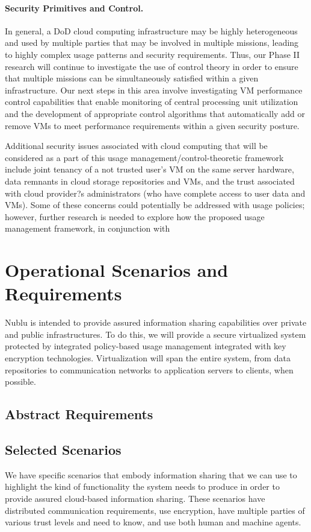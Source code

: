 \documentclass[10pt,letterpaper]{article}
\begin{document}
\paragraph{Security Primitives and Control.} In general, a DoD cloud computing infrastructure may be highly heterogeneous and used by multiple parties that may be involved in multiple missions, leading to highly complex usage patterns and security requirements. Thus, our Phase II research will continue to investigate the use of control theory in order to ensure that multiple missions can be simultaneously satisfied within a given infrastructure. Our next steps in this area involve investigating VM performance control capabilities that enable monitoring of central processing unit utilization and the development of appropriate control algorithms that automatically add or remove VMs to meet performance requirements within a given security posture.

Additional security issues associated with cloud computing that will be considered as a part of this usage management/control-theoretic framework include joint tenancy of a not trusted user's VM on the same server hardware, data remnants in cloud storage repositories and VMs, and the trust associated with cloud provider?s administrators (who have complete access to user data and VMs). Some of these concerns could potentially be addressed with usage policies; however, further research is needed to explore how the proposed usage management framework, in conjunction with

\section{Operational Scenarios and Requirements}
\label{section:req-scen}
Nublu is intended to provide assured information sharing capabilities over private and public infrastructures.  To do this, we will provide a secure virtualized system protected by integrated policy-based usage management integrated with key encryption technologies.  Virtualization will span the entire system, from data repositories to communication networks to application servers to clients, when possible.

\subsection{Abstract Requirements}
\label{sec:requirements}


\subsection{Selected Scenarios}
\label{sec:scenarios}
We have specific scenarios that embody information sharing that we can use to highlight the kind of functionality the system needs to produce in order to provide assured cloud-based information sharing.  These scenarios have distributed communication requirements, use encryption, have multiple parties of various trust levels and need to know, and use both human and machine agents.
\end{document}
